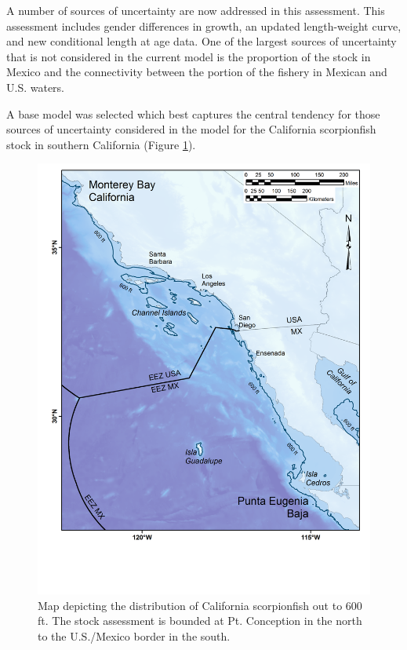 \documentclass[12pt,]{article}
\begin{document}
A number of sources of uncertainty are now addressed in this assessment.
This assessment includes gender differences in growth, an updated
length-weight curve, and new conditional length at age data. One of the
largest sources of uncertainty that is not considered in the current
model is the proportion of the stock in Mexico and the connectivity
between the portion of the fishery in Mexican and U.S. waters.

A base model was selected which best captures the central tendency for
those sources of uncertainty considered in the model for the California
scorpionfish stock in southern California (Figure
\ref{fig:assess_region_map}).

\begin{figure}[htbp]
\centering
\includegraphics{Figures/assess_region_map.png}
\caption{Map depicting the distribution of California scorpionfish out
to 600 ft. The stock assessment is bounded at Pt. Conception in the
north to the U.S./Mexico border in the south.
\label{fig:assess_region_map}}
\end{figure}
\end{document}
